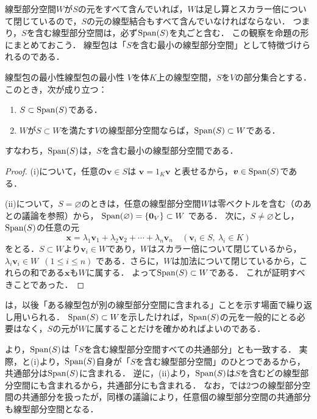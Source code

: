 線型部分空間$W$が$S$の元をすべて含んでいれば，$W$は足し算とスカラー倍について閉じているので，$S$の元の線型結合もすべて含んでいなければならない．
つまり，$S$を含む線型部分空間は，必ず$\operatorname{Span}(S)$を丸ごと含む．
この観察を命題の形にまとめておこう．
線型包は「$S$を含む最小の線型部分空間」として特徴づけられるのである．

\begin{prop}{線型包の最小性}{線型包の最小性}
  $V$を体$K$上の線型空間，$S$を$V$の部分集合とする．このとき，次が成り立つ：
  \begin{enumerate}[label=(\roman*),leftmargin=3.2em]
    \item $S \subset \operatorname{Span}(S)$である．
    \item $W$が$S \subset W$を満たす$V$の線型部分空間ならば，$\operatorname{Span}(S) \subset W$である．
  \end{enumerate}
  すなわち，$\operatorname{Span}(S)$は，$S$を含む最小の線型部分空間である．
\end{prop}

\begin{tleftbar}
\begin{proof}
  (i)について，任意の$\bm{v} \in S$は
  $\bm{v} = 1_K \bm{v}$
  と表せるから，$\bm{v} \in \operatorname{Span}(S)$である．

  (ii)について，$S = \varnothing$のときは，任意の線型部分空間$W$は零ベクトルを含む（のあとの議論を参照）から，
  $\operatorname{Span}(\varnothing) = \{\bm{0}_V\} \subset W$
  である．
  次に，$S \neq \varnothing$とし，$\operatorname{Span}(S)$の任意の元
  \[
    \bm{x} = \lambda_1 \bm{v}_1 + \lambda_2 \bm{v}_2 + \cdots + \lambda_n \bm{v}_n
    \quad (\bm{v}_i \in S,\ \lambda_i \in K)
  \]
  をとる．$S \subset W$より$\bm{v}_i \in W$であり，$W$はスカラー倍について閉じているから，
  $\lambda_i \bm{v}_i \in W$~$(1 \le i \le n)$
  である．さらに，$W$は加法について閉じているから，これらの和である$\bm{x}$も$W$に属する．
  よって$\operatorname{Span}(S) \subset W$である．
  これが証明すべきことであった．
\end{proof}
\end{tleftbar}

は，以後「ある線型包が別の線型部分空間に含まれる」ことを示す場面で繰り返し用いられる．
$\operatorname{Span}(S)\subset W$を示したければ，$\operatorname{Span}(S)$の元を一般的にとる必要はなく，$S$の元が$W$に属することだけを確かめればよいのである．

\begin{remark}[線型包と共通部分]
より，$\operatorname{Span}(S)$は「$S$を含む線型部分空間すべての共通部分」とも一致する．
実際，と(i)より，$\operatorname{Span}(S)$自身が「$S$を含む線型部分空間」のひとつであるから，共通部分は$\operatorname{Span}(S)$に含まれる．
逆に，(ii)より，$\operatorname{Span}(S)$は$S$を含むどの線型部分空間にも含まれるから，共通部分にも含まれる．
なお，では$2$つの線型部分空間の共通部分を扱ったが，同様の議論により，任意個の線型部分空間の共通部分も線型部分空間となる．
\end{remark}

